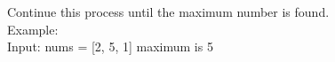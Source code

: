 \documentclass[preview]{standalone}
\begin{document}
Continue this process until the maximum number is found.\\Example:\\Input: nums = [2, 5, 1] maximum is 5\\
\end{document}
